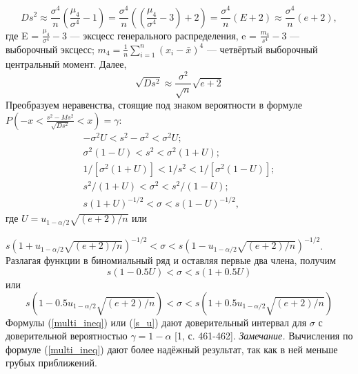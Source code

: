 \begin{equation}
Ds^{2} \approx \frac{\sigma^{4}}{n}(\frac{\mu_{4}}{\sigma^{4}} - 1) = 
\frac{\sigma^{4}}{n}((\frac{\mu_{4}}{\sigma^{4}} - 3) + 2) = \frac{\sigma^{4}}{n}(E + 2) \approx \frac{\sigma^{4}}{n}(e + 2),
\label{Ds_2}
\end{equation}
где E = $\frac{\mu_{4}}{\sigma^{4}} - 3$ — эксцесс генерального распределения, e = $\frac{m_{4}}{s^{4}} - 3$ — выборочный эксцесс; $m_{4} = \frac{1}{n}\sum_{i =1}^{n}{(x_{i} - \bar{x})^{4}}$  — четвёртый выборочный центральный момент. Далее,
\begin{equation}
\sqrt{Ds^{2}} \approx \frac{\sigma^{2}}{\sqrt{n}}\sqrt{e + 2}
\label{sqrt_Ds}
\end{equation}
Преобразуем неравенства, стоящие под знаком вероятности в формуле
\newline
$P\left(-x < \frac{s^{2}-Ms^{2}}{\sqrt{Ds^{2}}} < x\right) = \gamma$:
\begin{equation}
\begin{split}
-\sigma^{2}U < s^{2} -\sigma^{2} < \sigma^{2}U; \\
\sigma^{2}(1-U) < s^{2} < \sigma^{2}(1 + U); \\
1/[\sigma^{2}(1 + U)] < 1/s^{2} < 1/[\sigma^{2}(1-U)];\\
s^{2}/(1 + U) < \sigma^{2} < s^{2}/(1-U);\\
s(1 + U)^{-1/2} < \sigma < s(1-U)^{-1/2},
\label{multi_ineq}
\end{split}
\end{equation}
где $U = u_{1-\alpha/2}\sqrt{(e+2)/n}$ или
\newline

$s(1 + u_{1-\alpha/2}\sqrt{(e + 2)/n})^{-1/2} < \sigma < s(1-u_{1-\alpha/2}\sqrt{(e + 2)/n})^{-1/2}$.
\newline
Разлагая функции в биномиальный ряд и оставляя первые два члена, получим
\begin{equation}
s(1-0.5U) < \sigma < s(1 + 0.5U)
\label{s_U}
\end{equation}
или
\begin{equation}
	s(1-0.5u_{1-\alpha/2}\sqrt{(e + 2)/n}) < \sigma < s(1 + 0.5 u_{1-\alpha/2}\sqrt{(e + 2)/n})
\label{s_u}
\end{equation}
Формулы (\ref{multi_ineq}) или (\ref{s_u}) дают доверительный интервал для $\sigma$ с доверительной вероятностью $\gamma = 1-\alpha$ [1, с. 461-462]. 
\newline
\textit{Замечание.} Вычисления по формуле (\ref{multi_ineq}) дают более надёжный результат, так как в ней меньше грубых приближений.